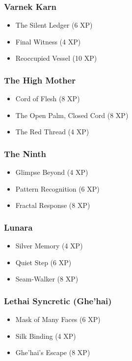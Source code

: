 \subsubsection{Varnek Karn}
\begin{itemize}
\item The Silent Ledger (6 XP)
\item Final Witness (4 XP)
\item Reoccupied Vessel (10 XP)
\end{itemize}

\subsubsection{The High Mother}
\begin{itemize}
\item Cord of Flesh (8 XP)
\item The Open Palm, Closed Cord (8 XP)
\item The Red Thread (4 XP)
\end{itemize}

\subsubsection{The Ninth}
\begin{itemize}
\item Glimpse Beyond (4 XP)
\item Pattern Recognition (6 XP)
\item Fractal Response (8 XP)
\end{itemize}

\subsubsection{Lunara}
\begin{itemize}
\item Silver Memory (4 XP)
\item Quiet Step (6 XP)
\item Seam-Walker (8 XP)
\end{itemize}

\subsubsection{Lethai Syncretic (Ghe'hai)}
\begin{itemize}
\item Mask of Many Faces (6 XP)
\item Silk Binding (4 XP)
\item Ghe'hai's Escape (8 XP)
\end{itemize}

